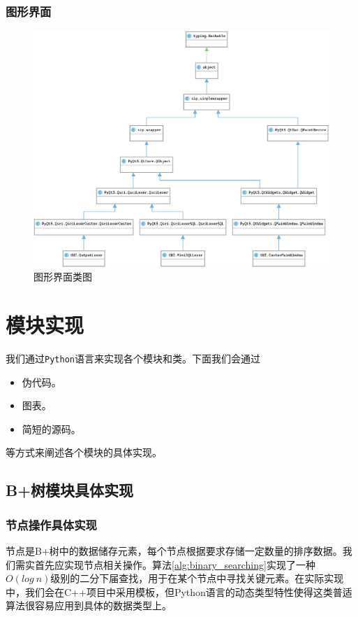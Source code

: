 \documentclass[UTF8]{ctexrep} %
\begin{document}
\subsection{图形界面}
\begin{figure}[H]
    \centering
    \includegraphics[width=\linewidth]{figure/gui_class.eps}
    \caption{图形界面类图}
    \label{fig:gui_class}
\end{figure}

\chapter{模块实现}
我们通过\texttt{Python}语言来实现各个模块和类。下面我们会通过
\begin{itemize}
    \item 伪代码。
    \item 图表。
    \item 简短的源码。
\end{itemize}
等方式来阐述各个模块的具体实现。

\section{B+树模块具体实现}
\subsection{节点操作具体实现}
节点是B+树中的数据储存元素，每个节点根据要求存储一定数量的排序数据。我们需实首先应实现节点相关操作。算法\ref{alg:binary_searching}实现了一种$O(log\ n)$级别的二分下届查找，用于在某个节点中寻找关键元素。在实际实现中，我们会在C++项目中采用模板，但Python语言的动态类型特性使得这类普适算法很容易应用到具体的数据类型上。
\end{document}
